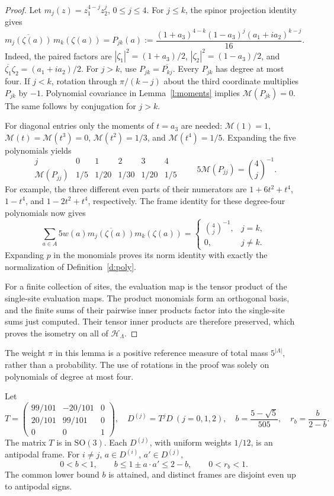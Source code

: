 \begin{proof}
Let \(m_j(z)=z_1^{4-j}z_2^j\), \(0\le j\le4\).
For \(j\le k\), the spinor projection identity gives
\[
 \overline{m_j(\zeta(a))}\,m_k(\zeta(a))
 =P_{jk}(a):=
 \frac{(1+a_3)^{4-k}(1-a_3)^j(a_1+i a_2)^{k-j}}{16}.
\]
Indeed, the paired factors are
\(|\zeta_1|^2=(1+a_3)/2\),
\(|\zeta_2|^2=(1-a_3)/2\), and
\(\overline{\zeta_1}\zeta_2=(a_1+i a_2)/2\).
For \(j>k\), use \(P_{jk}=\overline{P_{kj}}\).
Every \(P_{jk}\) has degree at most four. If \(j<k\), rotation
through \(\pi/(k-j)\) about the third coordinate multiplies
\(P_{jk}\) by \(-1\). Polynomial covariance in
Lemma~\ref{l:moments} implies \(\mathcal M(P_{jk})=0\).
The same follows by conjugation for \(j>k\).

For diagonal entries only the moments of \(t=a_3\) are needed:
\(\mathcal M(1)=1\), \(\mathcal M(t)=\mathcal M(t^3)=0\),
\(\mathcal M(t^2)=1/3\), and \(\mathcal M(t^4)=1/5\).
Expanding the five polynomials yields
\[
 \begin{array}{c|ccccc}
 j&0&1&2&3&4\\ \hline
 \mathcal M(P_{jj})&1/5&1/20&1/30&1/20&1/5
 \end{array}
 \qquad
 5\mathcal M(P_{jj})=\binom4j^{-1}.
\]
For example, the three different even parts of their numerators
are \(1+6t^2+t^4\), \(1-t^4\), and
\(1-2t^2+t^4\), respectively. The frame identity for these
degree-four polynomials now gives
\[
 \sum_{a\in A}5w(a)
       \overline{m_j(\zeta(a))}m_k(\zeta(a))
       =\begin{cases}\binom4j^{-1},&j=k,\\0,&j\ne k.\end{cases}
\]
Expanding \(p\) in the monomials proves its norm identity with
exactly the normalization of Definition~\ref{d:poly}.

For a finite collection of sites, the evaluation map is the tensor
product of the single-site evaluation maps. The product monomials
form an orthogonal basis, and the finite sums of their pairwise
inner products factor into the single-site sums just computed.
Their tensor inner products are therefore preserved, which proves
the isometry on all of \(\mathcal H_\Lambda\).
\end{proof}

The weight \(\pi\) in this lemma is a positive reference measure
of total mass \(5^{|\Lambda|}\), rather than a probability.
The use of rotations in the proof was solely on polynomials of
degree at most four.

\begin{lemma}\label{l:threeframes}
Let
\[
 T=\begin{pmatrix}99/101&-20/101&0\\20/101&99/101&0\\0&0&1\end{pmatrix},
 \quad D^{(j)}=T^jD\ (j=0,1,2),\quad
 b=\frac{5-\sqrt5}{505},\quad r_b=\frac b{2-b}.
\]
The matrix \(T\) is in \(\mathrm{SO}(3)\).
Each \(D^{(j)}\), with uniform weights \(1/12\), is an antipodal frame.
For \(i\ne j\), \(a\in D^{(i)}\), \(a'\in D^{(j)}\),
\[
 0<b<1,\qquad b\le1\pm a\cdot a'\le2-b,\qquad0<r_b<1.
\]
The common lower bound \(b\) is attained, and distinct frames are
disjoint even up to antipodal signs.
\end{lemma}

